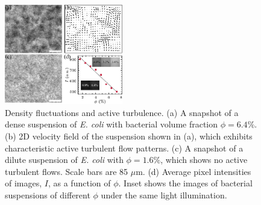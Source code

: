 \documentclass[twocolumn,aps,prx,amsmath,amssymb,longbibliography]{revtex4-2}
\begin{document}
\begin{figure}[t]
	\begin{center}
		\includegraphics[width=0.46\textwidth]{Figures/experiment/v6.pdf}
		\caption[Experimental details]
		{Density fluctuations and active turbulence.
			(a) A snapshot of a dense suspension of \textit{E. coli} with bacterial volume fraction $\phi = 6.4\%$.
			(b) 2D velocity field of the suspension shown in (a), which exhibits characteristic active turbulent flow patterns.
			(c) A snapshot of a dilute suspension of \textit{E. coli} with $\phi = 1.6\%$, which shows no active turbulent flows. Scale bars are 85 $\mu$m.
			(d) Average pixel intensities of images, $I$, as a function of $\phi$. Inset shows the images of bacterial suspensions of different $\phi$ under the same light illumination.
		}
		\label{fig:experiment}
	\end{center}
\end{figure}
\end{document}
